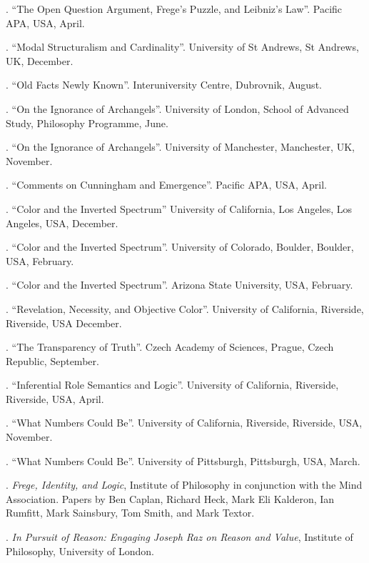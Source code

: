 \documentclass[11pt]{article}
\begin{document}
. ``The Open Question Argument, Frege's Puzzle, and Leibniz's Law''. Pacific APA, USA, April.

. ``Modal Structuralism and Cardinality''.  University of St Andrews, St Andrews, UK, December.

. ``Old Facts Newly Known''. Interuniversity Centre, Dubrovnik, August.

. ``On the Ignorance of Archangels''. University of London, School of Advanced Study, Philosophy Programme, June.

. ``On the Ignorance of Archangels''. University of Manchester, Manchester, UK, November.

. ``Comments on Cunningham and Emergence''. Pacific APA, USA, April.

. ``Color and the Inverted Spectrum'' University of California, Los Angeles, Los Angeles, USA, December.

. ``Color and the Inverted Spectrum''. University of Colorado, Boulder, Boulder, USA, February.

. ``Color and the Inverted Spectrum''. Arizona State University, USA, February.

. ``Revelation, Necessity, and Objective Color''. University of California, Riverside, Riverside, USA December.

. ``The Transparency of Truth''. Czech Academy of Sciences, Prague, Czech Republic, September.

. ``Inferential Role Semantics and Logic''. University of California, Riverside, Riverside, USA, April.

. ``What Numbers Could Be''. University of California, Riverside, Riverside, USA, November.

. ``What Numbers Could Be''. University of Pittsburgh, Pittsburgh, USA, March.



\bigskip

\medskip

. \emph{Frege, Identity, and Logic}, Institute of Philosophy in conjunction with the Mind Association. Papers by Ben Caplan, Richard Heck, Mark Eli Kalderon, Ian Rumfitt, Mark Sainsbury, Tom Smith, and Mark Textor.

. \emph{In Pursuit of Reason: Engaging Joseph Raz on Reason and Value}, Institute of Philosophy, University of London.
\end{document}
